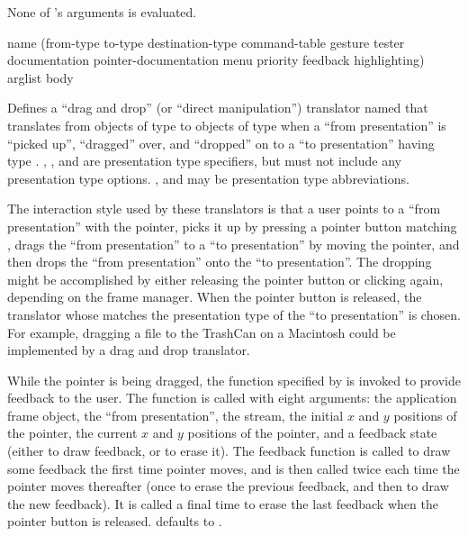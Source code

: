 None of 's arguments is evaluated.


 {name
                                             (from-type to-type destination-type command-table 
                                              \key gesture tester
                                                   documentation pointer-documentation
                                                   menu priority
                                                   feedback highlighting)
                                             arglist
                                             \body body}

Defines a ``drag and drop'' (or ``direct manipulation'') translator named
 that translates from objects of type  to objects of
type  when a ``from presentation'' is ``picked up'', ``dragged''
over, and ``dropped'' on to a ``to presentation'' having type
.  , , and
 are presentation type specifiers, but must not include
any presentation type options.  ,  and
 may be presentation type abbreviations.

The interaction style used by these translators is that a user points to a
``from presentation'' with the pointer, picks it up by pressing a pointer button
matching , drags the ``from presentation'' to a ``to presentation''
by moving the pointer, and then drops the ``from presentation'' onto the ``to
presentation''.  The dropping might be accomplished by either releasing the
pointer button or clicking again, depending on the frame manager.  When the
pointer button is released, the translator whose  matches
the presentation type of the ``to presentation'' is chosen.  For example,
dragging a file to the TrashCan on a Macintosh could be implemented by a drag
and drop translator.

While the pointer is being dragged, the function specified by  is
invoked to provide feedback to the user.  The function is called with eight
arguments: the application frame object, the ``from presentation'', the stream,
the initial $x$ and $y$ positions of the pointer, the current $x$ and $y$
positions of the pointer, and a feedback state (either  to draw
feedback, or  to erase it).  The feedback function is called to
draw some feedback the first time pointer moves, and is then called twice each
time the pointer moves thereafter (once to erase the previous feedback, and then
to draw the new feedback).  It is called a final time to erase the last feedback
when the pointer button is released.   defaults to
.

